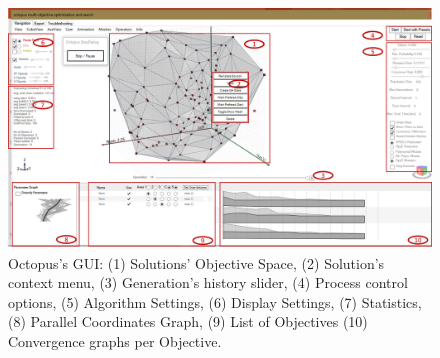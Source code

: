 	\begin{figure}[h]
		\centering
		\includegraphics[width=1\textwidth]{Images/Background/Octopus/octopus-menu.png}
		\caption[Octopus GUI]{Octopus's \ac{GUI}: (1) Solutions' Objective Space, (2) Solution's context menu, (3) Generation's history slider, (4) Process control options, (5) Algorithm Settings, (6) Display Settings, (7) Statistics, (8) Parallel Coordinates Graph, (9) List of Objectives (10) Convergence graphs per Objective.}
		\label{fig:octopus}
	\end{figure}
	

